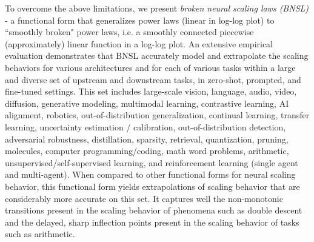 \documentclass{article} %
\begin{document}
To overcome the above limitations,  we present {\it broken neural scaling laws (BNSL)} - a functional form that generalizes power laws (linear in  log-log plot) %
to ``smoothly broken" power laws, i.e. a smoothly connected piecewise (approximately) linear function in a log-log plot.  An extensive empirical evaluation demonstrates that BNSL accurately model and extrapolate the scaling behaviors for various architectures and for each of various tasks within a large and diverse set of upstream and downstream tasks, in zero-shot, prompted, and fine-tuned settings. This set includes large-scale vision, language, audio, video, diffusion, generative modeling, multimodal learning, contrastive learning, AI alignment, robotics, out-of-distribution generalization, continual learning, transfer learning, uncertainty estimation / calibration, out-of-distribution detection, adversarial robustness, distillation, sparsity, retrieval, quantization, pruning, molecules, computer programming/coding, math word problems, arithmetic, unsupervised/self-supervised learning, and reinforcement learning (single agent and multi-agent).
When compared to other functional forms for neural scaling behavior, this functional form yields extrapolations of scaling behavior that are considerably more accurate on this set. It captures well the non-monotonic transitions present in the scaling behavior of phenomena such as double descent and the delayed, sharp inflection points present in the scaling behavior of tasks such as arithmetic.


\end{document}
